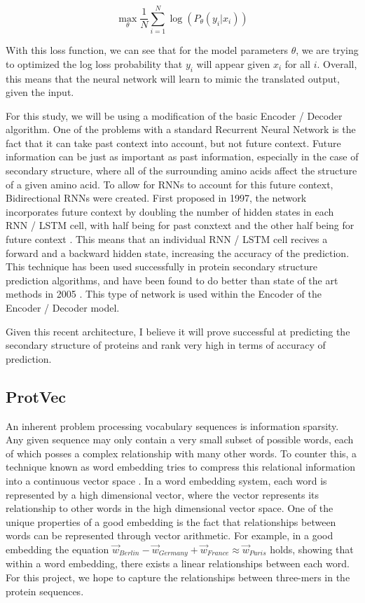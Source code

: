 \documentclass[pageno]{jpaper}
\begin{document}
\begin{equation} \label{eq:ed_loss}
	\underset{\theta}{\max} \frac{1}{N} \sum_{i = 1}^{N} \log(P_{\theta}(y_{i} \vert x_{i}))
\end{equation}

With this loss function, we can see that for the model parameters $\theta$, we are trying to optimized the log loss probability that $y_{i}$ will appear given $x_{i}$ for all $i$.  Overall, this means that the neural network will learn to mimic the translated output, given the input.

\par
For this study, we will be using a modification of the basic Encoder / Decoder algorithm.  One of the problems with a standard Recurrent Neural Network is the fact that it can take past context into account, but not future context.  Future information can be just as important as past information, especially in the case of secondary structure, where all of the surrounding amino acids affect the structure of a given amino acid.  To allow for RNNs to account for this future context, Bidirectional RNNs were created.  First proposed in 1997, the network incorporates future context by doubling the number of hidden states in each RNN / LSTM cell, with half being for past conxtext and the other half being for future context \cite{schuster:1997}.  This means that an individual RNN / LSTM cell recives a forward and a backward hidden state, increasing the accuracy of the prediction.  This technique has been used successfully in protein secondary structure prediction algorithms, and have been found to do better than state of the art methods in 2005 \cite{pollastri:2005}.  This type of network is used within the Encoder of the Encoder / Decoder model.

\par
Given this recent architecture, I believe it will prove successful at predicting the secondary structure of proteins and rank very high in terms of accuracy of prediction.


\subsection{ProtVec}
An inherent problem processing vocabulary sequences is information sparsity.  Any given sequence may only contain a very small subset of possible words, each of which posses a complex relationship with many other words.  To counter this, a technique known as word embedding tries to compress this relational information into a continuous vector space \cite{mikolov:2013}.  In a word embedding system, each word is represented by a high dimensional vector, where the vector represents its relationship to other words in the high dimensional vector space.  One of the unique properties of a good embedding is the fact that relationships between words can be represented through vector arithmetic.  For example, in a good embedding the equation $\vec{w}_{Berlin} - \vec{w}_{Germany} + \vec{w}_{France} \approx \vec{w}_{Paris}$ holds, showing that within a word embedding, there exists a linear relationships between each word.  For this project, we hope to capture the relationships between three-mers in the protein sequences.
\end{document}

